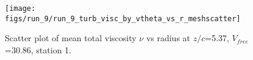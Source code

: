 \begin{figure}[H]
\centering
\texttt{[image: figs/run\_9/run\_9\_turb\_visc\_by\_vtheta\_vs\_r\_meshscatter]}
\caption{Scatter plot of mean total viscosity $\nu$ vs radius at $z/c$=5.37, $V_{free}$=30.86, station 1.}
\label{fig:run_9_turb_visc_by_vtheta_vs_r_meshscatter}
\end{figure}


